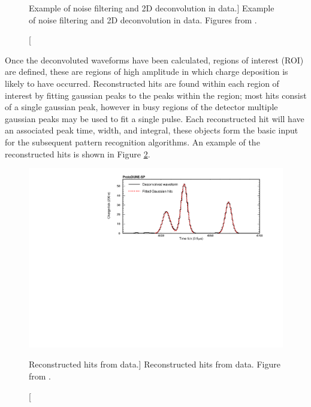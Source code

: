 \begin{figure}
	\caption
	[Example of noise filtering and 2D deconvolution in \protodune{} data.]
	{Example of noise filtering and 2D deconvolution in \protodune{} data. Figures from \cite{protoduneperf}.}

	\label{fig:2d_deconv}

\end{figure}

Once the deconvoluted waveforms have been calculated, regions of interest (ROI) 
are defined, these are regions of high amplitude in which charge deposition is
likely to have occurred. Reconstructed hits are found within each region of
interest by fitting gaussian peaks to the peaks within the region; most hits
consist of a single gaussian peak, however in busy regions of the detector
multiple gaussian peaks may be used to fit a single pulse. Each reconstructed
hit will have an associated peak time, width, and integral, these objects form
the basic input for the subsequent pattern recognition algorithms. An example of
the reconstructed hits is shown in Figure \ref{fig:gaushit}.

\begin{figure}

	\centering

	\includegraphics[width=\textwidth]{figures/gaushit.pdf}

	\caption
	[Reconstructed hits from \protodune{} data.]
	{Reconstructed hits from \protodune{} data. Figure from \cite{protoduneperf}.}

	\label{fig:gaushit}

\end{figure}

